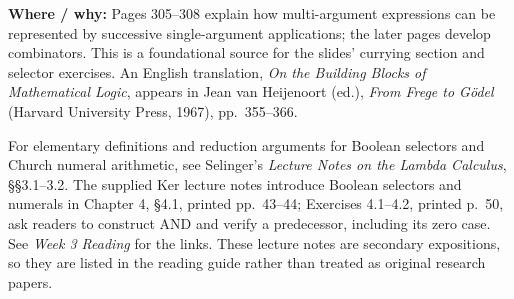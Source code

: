\documentclass[11pt]{article}
\begin{document}
\textbf{Where / why:} Pages 305--308 explain how multi-argument expressions can be represented by successive single-argument applications; the later pages develop combinators. This is a foundational source for the slides' currying section and selector exercises. An English translation, \emph{On the Building Blocks of Mathematical Logic}, appears in Jean van Heijenoort (ed.), \emph{From Frege to Gödel} (Harvard University Press, 1967), pp.~355--366.

For elementary definitions and reduction arguments for Boolean selectors and Church numeral arithmetic, see Selinger's \emph{Lecture Notes on the Lambda Calculus}, \S\S3.1--3.2. The supplied Ker lecture notes introduce Boolean selectors and numerals in Chapter 4, \S4.1, printed pp.~43--44; Exercises 4.1--4.2, printed p.~50, ask readers to construct AND and verify a predecessor, including its zero case. See \emph{Week 3 Reading} for the links. These lecture notes are secondary expositions, so they are listed in the reading guide rather than treated as original research papers.
\end{document}
